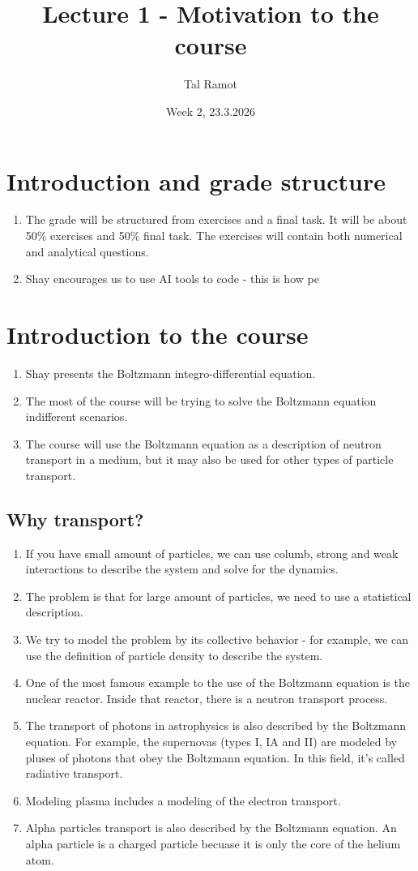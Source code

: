 \documentclass[11pt]{article}
\title{Lecture 1 - Motivation to the course}
\author{Tal Ramot}
\date{Week 2, 23.3.2026}
\begin{document}
\maketitle

\section{Introduction and grade structure}
\begin{enumerate}
\item The grade will be structured from exercises and a final task. It will be about 50\% exercises and 50\% final task.
The exercises will contain both numerical and analytical questions.
\item Shay encourages us to use AI tools to code - this is how pe
\end{enumerate}

\section{Introduction to the course}
\begin{enumerate}
\item Shay presents the Boltzmann integro-differential equation.
\item The most of the course will be trying to solve the Boltzmann equation indifferent scenarios.
\item The course will use the Boltzmann equation as a description of neutron transport in a medium, but it may also be used for other types of particle transport. 
\end{enumerate}
\subsection{Why transport?}
\begin{enumerate}
    \item If you have small amount of particles, we can use columb, strong and weak interactions to describe the system and solve for the dynamics.
    \item The problem is that for large amount of particles, we need to use a statistical description.
    \item We try to model the problem by its collective behavior - for example, we can use the definition of particle density to describe the system.
    \item One of the most famous example to the use of the Boltzmann equation is the nuclear reactor. Inside that reactor, there is a neutron transport process.
    \item The transport of photons in astrophysics is also described by the Boltzmann equation. For example, the supernovas (types I, IA and II) are modeled by pluses of photons that obey the Boltzmann equation. In this field, it's called radiative transport.
    \item Modeling plasma includes a modeling of the electron transport.
    \item Alpha particles transport is also described by the Boltzmann equation. An alpha particle is a charged particle becuase it is only the core of the helium atom.
\end{enumerate}
\end{document}
